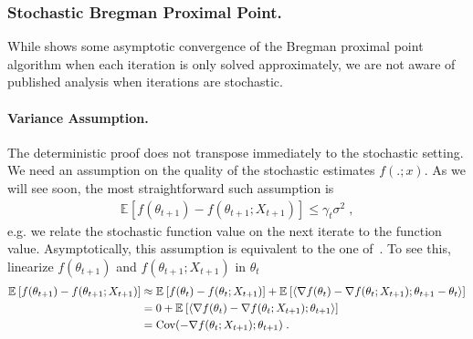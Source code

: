 \documentclass{article}
\newcommand*{\expect}[2][]{\ensuremath{\mathbb{E}_{#1} \left[ #2 \right] }} %
\newcommand{\nat}{\theta}
\newcommand{\lr}{\gamma} %
\begin{document}
\subsubsection{Stochastic Bregman Proximal Point.}
While \citet{eckstein1998approximate} shows some asymptotic convergence of the Bregman proximal point algorithm when each iteration is only solved approximately, we are not aware of published analysis when iterations are stochastic.

\paragraph{Variance Assumption.}
The deterministic proof does not transpose immediately to the stochastic setting.
We need an assumption on the quality of the stochastic estimates $f(. ; x)$. 
As we will see soon, the most straightforward such assumption is 
\begin{align}
\boxed{\expect{f(\nat_{t+1}) - f(\nat_{t+1} ; X_{t+1})} \leq \lr_t \sigma^2 \; , }
\label{eq:proximal_variance}
\end{align}
e.g. we relate the stochastic function value on the next iterate to the function value.
Asymptotically, this assumption is equivalent to the one of~\citet{hanzely2018fastest}. 
To see this, linearize $f(\nat_{t+1})$ and $f(\nat_{t+1} ; X_{t+1}) $ in $\nat_t$
\begin{align}
	\expect{f(\nat_{t+1}) - f(\nat_{t+1} ; X_{t+1})} 
	&\approx \expect{f(\nat_{t}) - f(\nat_{t} ; X_{t+1})} + \expect{\langle \nabla f(\nat_t) - \nabla f(\nat_t ; X_{t+1}) ; \nat_{t+1} - \nat_t \rangle } \\
	&= 0 + \expect{\langle \nabla f(\nat_t) - \nabla f(\nat_t ; X_{t+1}) ; \nat_{t+1} \rangle } \\
	& = \Cov(- \nabla f(\nat_t ; X_{t+1})  ; \nat_{t+1} ) \; .
\end{align} 
\end{document}

